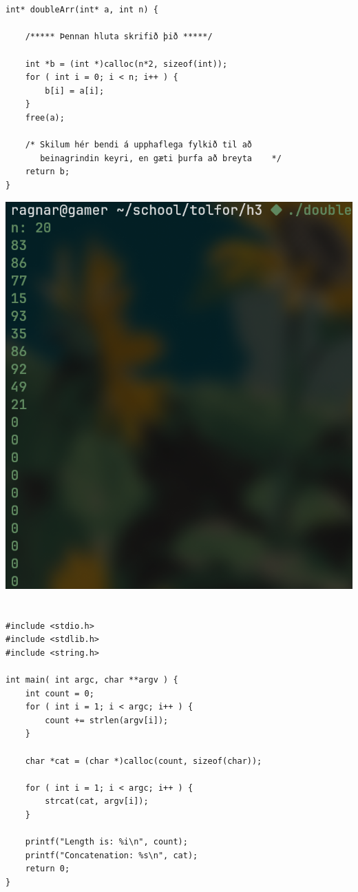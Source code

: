 \documentclass{article}
\begin{document}
\section{}
\begin{verbatim}
int* doubleArr(int* a, int n) {

    /***** Þennan hluta skrifið þið *****/

	int *b = (int *)calloc(n*2, sizeof(int));
	for ( int i = 0; i < n; i++ ) {
		b[i] = a[i];
	}
	free(a);

    /* Skilum hér bendi á upphaflega fylkið til að
       beinagrindin keyri, en gæti þurfa að breyta    */
    return b;
}
\end{verbatim}
\begin{center}
\includegraphics[scale=0.25]{double.png}
\end{center}

\section{}

\begin{verbatim}
#include <stdio.h>
#include <stdlib.h>
#include <string.h>

int main( int argc, char **argv ) {
	int count = 0;
	for ( int i = 1; i < argc; i++ ) {
		count += strlen(argv[i]); 
	}

	char *cat = (char *)calloc(count, sizeof(char));

	for ( int i = 1; i < argc; i++ ) {
		strcat(cat, argv[i]);
	}

	printf("Length is: %i\n", count);
	printf("Concatenation: %s\n", cat);
	return 0;
}
\end{verbatim}
\end{document}
